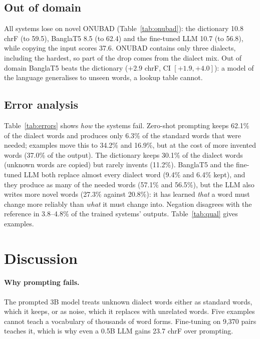 \documentclass[10pt,twocolumn]{article}
\begin{document}


\subsection{Out of domain}
All systems lose on novel ONUBAD (Table~\ref{tab:onubad}): the dictionary 10.8 chrF (to
59.5), BanglaT5 8.5 (to 62.4) and the fine-tuned LLM 10.7 (to 56.8), while
copying the input scores 37.6. ONUBAD contains only three dialects, including the hardest, so part of
the drop comes from the dialect mix. Out of domain BanglaT5 beats the dictionary ($+2.9$ chrF, CI $[+1.9, +4.0]$): a model
of the language generalises to unseen words, a lookup table cannot.



\subsection{Error analysis}
Table~\ref{tab:errors} shows \emph{how} the systems fail. Zero-shot prompting keeps 62.1\% of the
dialect words and produces only 6.3\% of the standard words that were needed; examples move this to
34.2\% and 16.9\%, but at the cost of more invented words (37.0\% of the output). The
dictionary keeps 30.1\% of the dialect words (unknown words are copied) but rarely invents
(11.2\%). BanglaT5 and the fine-tuned LLM both replace almost every dialect word (9.4\% and
6.4\% kept), and they produce as many of the needed words (57.1\% and 56.5\%), but the LLM also writes
more novel words (27.3\% against 20.8\%): it has learned \emph{that} a word must change more reliably
than \emph{what} it must change into. Negation disagrees with the reference in 3.8--4.8\% of the
trained systems' outputs. Table~\ref{tab:qual} gives examples.




\section{Discussion}
\paragraph{Why prompting fails.} The prompted 3B model treats unknown dialect words either as standard words,
which it keeps, or as noise, which it replaces with unrelated words. Five examples cannot teach a vocabulary
of thousands of word forms. Fine-tuning on 9,370 pairs teaches it, which is why even a 0.5B LLM gains
23.7 chrF over prompting.
\end{document}
